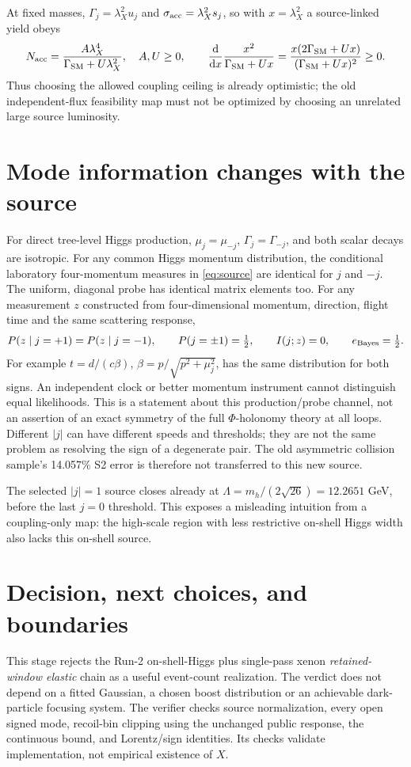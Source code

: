 \documentclass[11pt,a4paper]{article}
\newcommand{\dd}{\mathrm d}
\begin{document}
At fixed masses, $\Gamma_j=\lambda_X^2u_j$ and
$\sigma_{\rm acc}=\lambda_X^2s_j$, so with $x=\lambda_X^2$ a
source-linked yield obeys
\begin{equation}
 N_{\rm acc}=\frac{A\lambda_X^4}{\Gamma_{\rm SM}+U\lambda_X^2},
 \quad A,U\geq0,\qquad
 \frac{\dd}{\dd x}\frac{x^2}{\Gamma_{\rm SM}+Ux}
 =\frac{x(2\Gamma_{\rm SM}+Ux)}{(\Gamma_{\rm SM}+Ux)^2}\geq0 .
\end{equation}
Thus choosing the allowed coupling ceiling is already optimistic;
the old independent-flux feasibility map must not be optimized by
choosing an unrelated large source luminosity.

\section{Mode information changes with the source}
For direct tree-level Higgs production, $\mu_j=\mu_{-j}$,
$\Gamma_j=\Gamma_{-j}$, and both scalar decays are isotropic. For any
common Higgs momentum distribution, the conditional laboratory
four-momentum measures in \eqref{eq:source} are identical for $j$ and
$-j$. The uniform, diagonal probe has identical matrix elements too.
For any measurement $z$ constructed from four-dimensional momentum,
direction, flight time and the same scattering response,
\begin{equation}
 P(z\mid j=+1)=P(z\mid j=-1),\qquad
 P(j=\pm1)=\tfrac12,\qquad I(j;z)=0,\qquad e_{\rm Bayes}=\tfrac12 .
\end{equation}
For example $t=d/(c\beta)$, $\beta=p/\sqrt{p^2+\mu_j^2}$, has the
same distribution for both signs. An independent clock or better
momentum instrument cannot distinguish equal likelihoods. This is
a statement about this production/probe channel, not an assertion of
an exact symmetry of the full $\Phi$-holonomy theory at all loops.
Different $|j|$ can have different speeds and thresholds; they are
not the same problem as resolving the sign of a degenerate pair.
The old asymmetric collision sample's 14.057\% S2 error is therefore
not transferred to this new source.

The selected $|j|=1$ source closes already at
$\Lambda=m_h/(2\sqrt{26})=12.2651$ GeV, before the last $j=0$ threshold.
This exposes a misleading intuition from a coupling-only map:
the high-scale region with less restrictive on-shell Higgs width
also lacks this on-shell source.

\section{Decision, next choices, and boundaries}
This stage rejects the Run-2 on-shell-Higgs plus single-pass xenon
\emph{retained-window elastic} chain as a useful event-count realization.
The verdict does not depend on a fitted Gaussian, a chosen boost
distribution or an achievable dark-particle focusing system.
The verifier checks source normalization, every open signed mode,
recoil-bin clipping using the unchanged public response, the continuous
bound, and Lorentz/sign identities. Its checks validate implementation,
not empirical existence of $X$.
\end{document}
